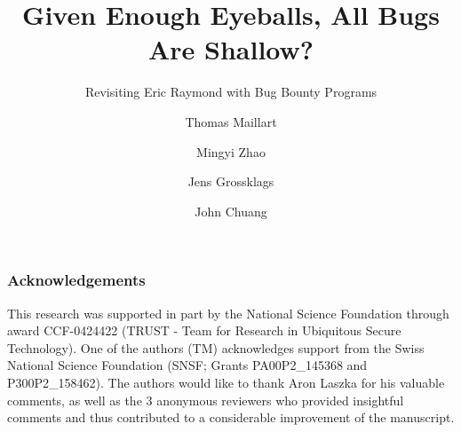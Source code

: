 \documentclass{llncs}
\begin{document}
\title{\large Given Enough Eyeballs, All Bugs Are Shallow?}
\subtitle{\normalsize Revisiting Eric Raymond with Bug Bounty Programs} 




\author{Thomas Maillart \and  Mingyi Zhao \and  Jens Grossklags  \and John Chuang }


\maketitle
\begin{abstract}


\end{abstract}








\subsubsection*{Acknowledgements}
This research was supported in part by the National Science Foundation through award CCF-0424422 (TRUST - Team for Research in Ubiquitous Secure Technology). One of the authors (TM) acknowledges support from the Swiss National Science Foundation (SNSF; Grants PA00P2\_145368  and P300P2\_158462). The authors would like to thank Aron Laszka for his valuable comments, as well as the 3 anonymous reviewers who provided insightful comments and thus contributed to a considerable improvement of the manuscript.





\clearpage

\end{document}
